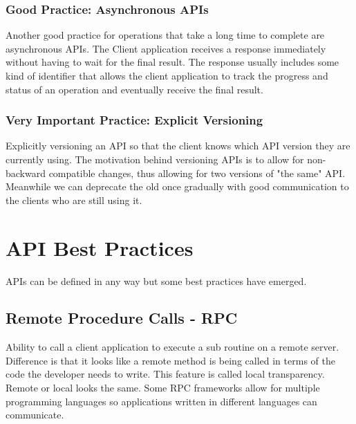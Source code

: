 \documentclass[a4paper, 11pt]{book}
\begin{document}
    \subsubsection{Good Practice: Asynchronous APIs}
    Another good practice for operations that take a long time to complete are asynchronous APIs.
    The Client application receives a response immediately without having to wait for the final result.
    The response usually includes some kind of identifier that allows the client application to track the progress
    and status of an operation and eventually receive the final result.

    \subsubsection{Very Important Practice: Explicit Versioning}
    Explicitly versioning an API so that the client knows which API version they are currently using.
    The motivation behind versioning APIs is to allow for non-backward compatible changes, thus allowing for two versions of "the same" API\@.
    Meanwhile we can deprecate the old once gradually with good communication to the clients who are still using it.


    \section{API Best Practices}
    APIs can be defined in any way but some best practices have emerged.

    \subsection{Remote Procedure Calls - RPC}
    Ability to call a client application to execute a sub routine on a remote server.
    Difference is that it looks like a remote method is being called in terms of the code the developer needs to write.
    This feature is called local transparency.
    Remote or local looks the same.
    Some RPC frameworks allow for multiple programming languages so applications written in different languages can communicate.
\end{document}
